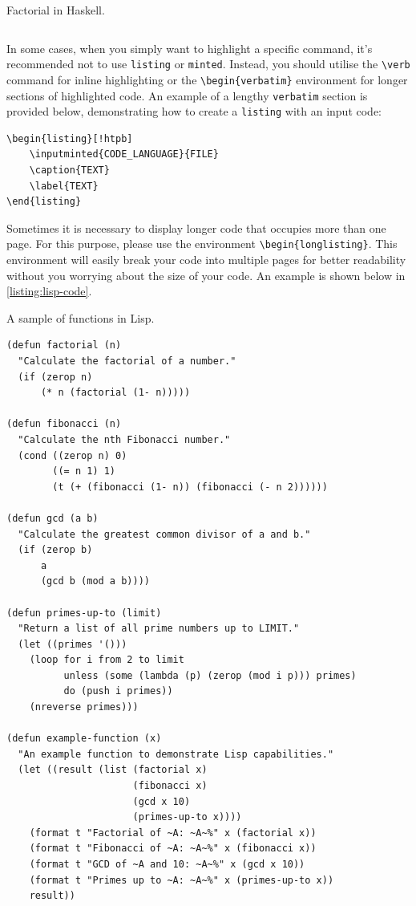 {\begin{listing}[!htpb]
\caption{Factorial in Haskell.}
\label{listing:haskell-code}
\inputminted{haskell}{Code/Factorial.hs}
\end{listing}

In some cases, when you simply want to highlight a specific command, it's recommended not to use \verb|listing| or \verb|minted|. Instead, you should utilise the \verb|\verb| command for inline highlighting or the \verb|\begin{verbatim}| environment for longer sections of highlighted code. An example of a lengthy \verb|verbatim| section is provided below, demonstrating how to create a \verb|listing| with an input code:

\begin{verbatim}
\begin{listing}[!htpb]
    \inputminted{CODE_LANGUAGE}{FILE}
    \caption{TEXT}
    \label{TEXT}
\end{listing}
\end{verbatim}

Sometimes it is necessary to display longer code that occupies more than one page. For this purpose, please use the environment \verb|\begin{longlisting}|. This environment will easily break your code into multiple pages for better readability without you worrying about the size of your code. An example is shown below in \autoref{listing:lisp-code}.

\begin{longlisting}
\caption{A sample of functions in Lisp.}
\label{listing:lisp-code}
\begin{verbatim}
(defun factorial (n)
  "Calculate the factorial of a number."
  (if (zerop n)
      (* n (factorial (1- n)))))

(defun fibonacci (n)
  "Calculate the nth Fibonacci number."
  (cond ((zerop n) 0)
        ((= n 1) 1)
        (t (+ (fibonacci (1- n)) (fibonacci (- n 2))))))

(defun gcd (a b)
  "Calculate the greatest common divisor of a and b."
  (if (zerop b)
      a
      (gcd b (mod a b))))

(defun primes-up-to (limit)
  "Return a list of all prime numbers up to LIMIT."
  (let ((primes '()))
    (loop for i from 2 to limit
          unless (some (lambda (p) (zerop (mod i p))) primes)
          do (push i primes))
    (nreverse primes)))

(defun example-function (x)
  "An example function to demonstrate Lisp capabilities."
  (let ((result (list (factorial x)
                      (fibonacci x)
                      (gcd x 10)
                      (primes-up-to x))))
    (format t "Factorial of ~A: ~A~%" x (factorial x))
    (format t "Fibonacci of ~A: ~A~%" x (fibonacci x))
    (format t "GCD of ~A and 10: ~A~%" x (gcd x 10))
    (format t "Primes up to ~A: ~A~%" x (primes-up-to x))
    result))


\end{verbatim}
\end{longlisting}}
